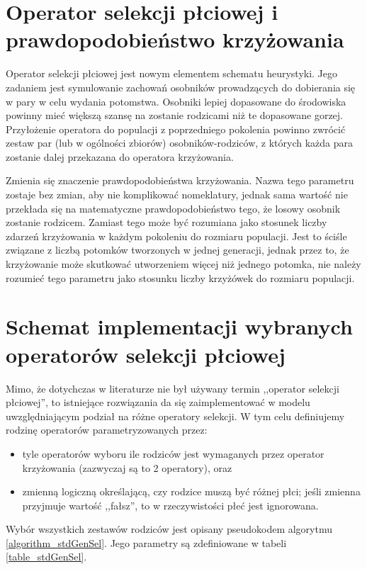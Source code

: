 \documentclass[twoside]{iisthesis}
\begin{document}
\section{Operator selekcji płciowej i prawdopodobieństwo krzyżowania} \label{section_genderSel}

Operator selekcji płciowej jest nowym elementem schematu heurystyki. Jego zadaniem jest symulowanie zachowań osobników prowadzących do dobierania się w pary w celu wydania potomstwa. Osobniki lepiej dopasowane do środowiska powinny mieć większą szansę na zostanie rodzicami niż te dopasowane gorzej. Przyłożenie operatora do populacji z poprzedniego pokolenia powinno zwrócić zestaw par (lub w ogólności zbiorów) osobników-rodziców, z których każda para zostanie dalej przekazana do operatora krzyżowania.

Zmienia się znaczenie prawdopodobieństwa krzyżowania. Nazwa tego parametru zostaje bez zmian, aby nie komplikować nomeklatury, jednak sama wartość nie przekłada się na matematyczne prawdopodobieństwo tego, że losowy osobnik zostanie rodzicem. Zamiast tego może być rozumiana jako stosunek liczby zdarzeń krzyżowania w każdym pokoleniu do rozmiaru populacji. Jest to ściśle związane z liczbą potomków tworzonych w jednej generacji, jednak przez to, że krzyżowanie może skutkować utworzeniem więcej niż jednego potomka, nie należy rozumieć tego parametru jako stosunku liczby krzyżówek do rozmiaru populacji.

\section{Schemat implementacji wybranych operatorów selekcji płciowej} \label{section_literatureSel}

Mimo, że dotychczas w literaturze nie był używany termin ,,operator selekcji płciowej'', to istniejące rozwiązania da się zaimplementować w modelu uwzględniającym podział na różne operatory selekcji. W tym celu definiujemy rodzinę operatorów parametryzowanych przez:
\begin{itemize}
	\item tyle operatorów wyboru ile rodziców jest wymaganych przez operator krzyżowania (zazwyczaj są to 2 operatory), oraz
	\item zmienną logiczną określającą, czy rodzice muszą być różnej płci; jeśli zmienna przyjmuje wartość ,,fałsz'', to w rzeczywistości płeć jest ignorowana.
\end{itemize}

Wybór wszystkich zestawów rodziców jest opisany pseudokodem algorytmu \ref{algorithm_stdGenSel}. Jego parametry są zdefiniowane w tabeli \ref{table_stdGenSel}.
\end{document}
